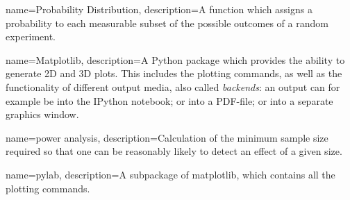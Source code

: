 \makeglossaries

{
        name=Probability Distribution,
        description={A function which assigns a probability to each measurable subset of the possible outcomes of a random experiment.}
}

{
        name=Matplotlib,
        description={A Python package which provides the ability to generate 2D and 3D plots. This includes the plotting commands, as well as the functionality of different output media, also called \emph{backends}: an output can for example be into the IPython notebook; or into a PDF-file; or into a separate graphics window.}
}

{
        name=power analysis,
        description={Calculation of the minimum sample size required so that one can be reasonably likely to detect an effect of a given size.}
}

{
        name=pylab,
        description={A subpackage of \gls{matplotlib}, which contains all the plotting commands.}
}


